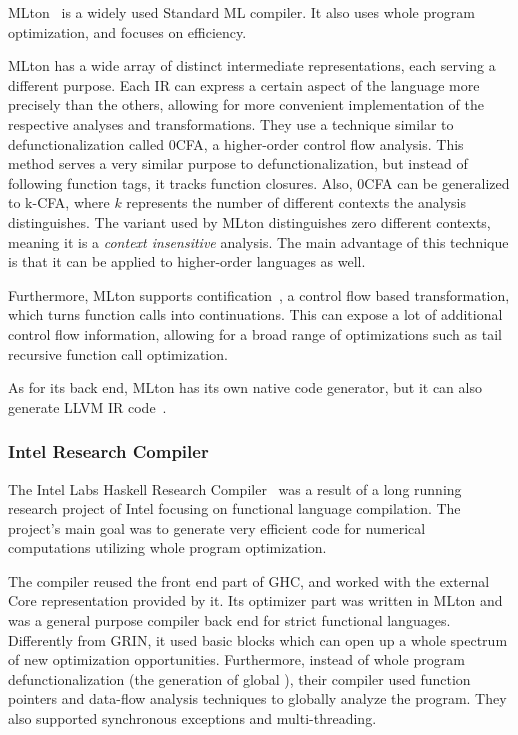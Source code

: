 \documentclass[main.tex]{subfiles}
\begin{document}
	MLton~\cite{mlton} is a widely used Standard ML compiler. It also uses whole program optimization, and focuses on efficiency.
	
	MLton has a wide array of distinct intermediate representations, each serving a different purpose. Each IR can express a certain aspect of the language more precisely than the others, allowing for more convenient implementation of the respective analyses and transformations. They use a technique similar to defunctionalization called 0CFA, a higher-order control flow analysis. This method serves a very similar purpose to defunctionalization, but instead of following function tags, it tracks function closures. Also, 0CFA can be generalized to k-CFA, where $k$ represents the number of different contexts the analysis distinguishes. The variant used by MLton distinguishes zero different contexts, meaning it is a \textit{context insensitive} analysis. The main advantage of this technique is that it can be applied to higher-order languages as well. 
	
	Furthermore, MLton supports contification~\cite{contification}, a control flow based transformation, which turns function calls into continuations. This can expose a lot of additional control flow information, allowing for a broad range of optimizations such as tail recursive function call optimization.
	
	As for its back end, MLton has its own native code generator, but it can also generate LLVM IR code~\cite{mlton-llvm}.
	
	\subsubsection{Intel Research Compiler}
	
	The Intel Labs Haskell Research Compiler~\cite{hrc} was a result of a long running research project of Intel focusing on functional language compilation. The project's main goal was to generate very efficient code for numerical computations utilizing whole program optimization.
	
	The compiler reused the front end part of GHC, and worked with the external Core representation provided by it. Its optimizer part was written in MLton and was a general purpose compiler back end for strict functional languages. Differently from GRIN, it used basic blocks which can open up a whole spectrum of new optimization opportunities. Furthermore, instead of whole program defunctionalization (the generation of global ), their compiler used function pointers and data-flow analysis techniques to globally analyze the program. They also supported synchronous exceptions and multi-threading.
	
\end{document}
